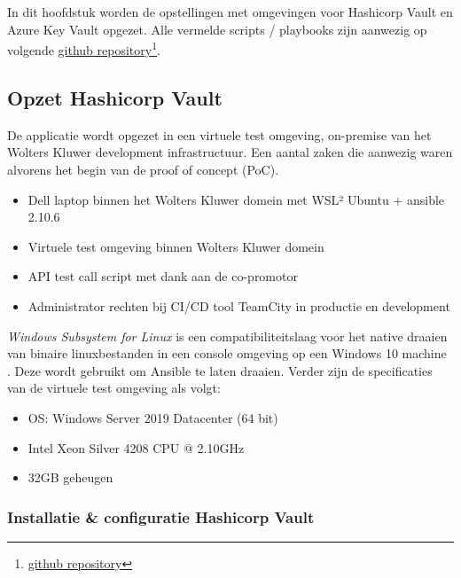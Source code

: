 
\chapter{}
\label{ch:poc}

In dit hoofdstuk worden de opstellingen met omgevingen voor Hashicorp Vault en Azure Key Vault opgezet. Alle vermelde scripts / playbooks zijn aanwezig op volgende \href{https://github.com/Rayenasr/Secrets-management-thesis}{github repository}\footnote{\href{https://github.com/Rayenasr/Secrets-management-thesis}{github repository}}.

\section{Opzet Hashicorp Vault}

De applicatie wordt opgezet in een virtuele test omgeving, on-premise van het Wolters Kluwer development infrastructuur. Een aantal zaken die aanwezig waren alvorens het begin van de proof of concept (PoC).

\begin{itemize}
    \item Dell laptop binnen het Wolters Kluwer domein met WSL² Ubuntu + ansible 2.10.6  
    \item Virtuele test omgeving binnen Wolters Kluwer domein
    \item API test call script met dank aan de co-promotor
    \item Administrator rechten bij CI/CD tool TeamCity in productie en development
\end{itemize}
\textit{Windows Subsystem for Linux} is een compatibiliteitslaag voor het native draaien van binaire linuxbestanden in een console omgeving op een Windows 10 machine \autocite{wsl2021}. Deze wordt gebruikt om Ansible te laten draaien. Verder zijn de specificaties van de virtuele test omgeving als volgt:

\begin{itemize}
    \item OS: Windows Server 2019 Datacenter (64 bit)
    \item Intel Xeon Silver 4208 CPU @ 2.10GHz
    \item 32GB geheugen
\end{itemize}

\subsection{Installatie \& configuratie Hashicorp Vault}

